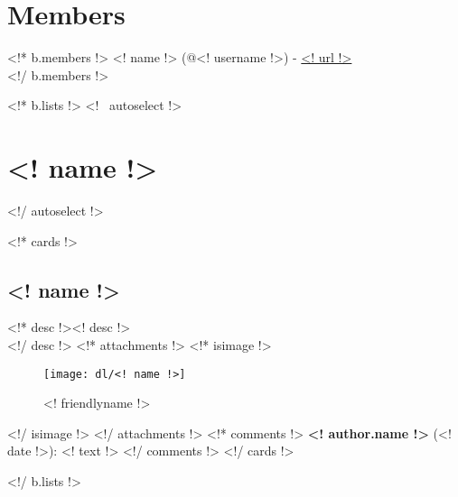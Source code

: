 



\renewcommand{\currentchapter}{<! b.title !>}
\renewcommand{\today}{<!* b.desc !><! b.desc !><!/ b.desc !><!~ b.desc !>FTC Notebook 2014-2015<!/ b.desc !>}
\renewcommand{\currentpart}{Revision <! b.lastmodified !>}

\setcounter{chapter}{1}
\renewcommand{\thesection}{Table of Contents}
\renewcommand\contentsname{}
\setcounter{tocdepth}{4}
\tableofcontents
\renewcommand{\thesection}{}
\cleardoublepage
{}

\blankpage
\newpage

\section{Members}
<!* b.members !>
<! name !> (@<! username !>) - \url{<! url !>}\\
<!/ b.members !>

<!* b.lists !>
<!~ autoselect !>\section{<! name !>}<!/ autoselect !>

<!* cards !>
\subsection{<! name !>}
<!* desc !><! desc !>\\<!/ desc !>
<!* attachments !>
<!* isimage !>
\begin{figure}
  \color{darkgray}
  \centering
  \texttt{[image: dl/<! name !>]}
  \caption[]{<! friendlyname !>}
  \label{fig:<! name !>}
\end{figure}
<!/ isimage !>
<!/ attachments !>
<!* comments !>
{\bf <! author.name !>} (<! date !>): <! text !>
<!/ comments !>
<!/ cards !>

<!/ b.lists !>


